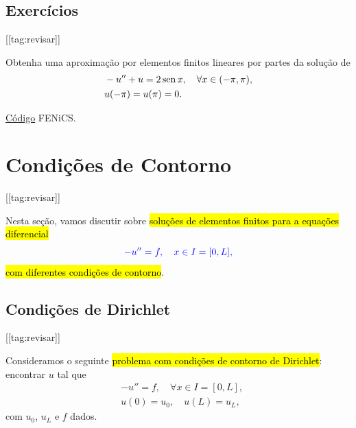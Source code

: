 \subsection{Exercícios}
[[tag:revisar]]

\begin{exer}\label{exer:dc}
  Obtenha uma aproximação por elementos finitos lineares por partes da solução de
  \begin{align}
    &-u'' + u = 2\operatorname{sen} x,\quad \forall x\in (-\pi, \pi),\\
    &u(-\pi)=u(\pi)=0.
  \end{align}
\end{exer}
\begin{resp}
  \ifispython
  \href{https://github.com/phkonzen/notas/blob/master/src/MetodoElementosFinitos/cap_mef1d/dados/exer_dc/exer_dc.py}{Código} FENiCS.
  \fi
\end{resp}


\section{Condições de Contorno}\label{cap_mef1d_sec_cc}
[[tag:revisar]]

Nesta seção, vamos discutir sobre \hl{soluções de elementos finitos para a equações diferencial}
\begin{equation}\color{blue}-u'' = f,\quad x\in I=[0, L],
\end{equation}
\hl{com diferentes condições de contorno}.

\subsection{Condições de Dirichlet}
[[tag:revisar]]

Consideramos o seguinte \hl{problema com condições de contorno de Dirichlet}{\dirichlet}: encontrar $u$ tal que
\begin{align}
  &-u'' = f,\quad \forall x\in I=[0, L],\label{eq:cc_d_eq}\\
  &u(0) = u_0,\quad u(L) = u_L,\label{eq:cc_d_bc}
\end{align}
com $u_0$, $u_L$ e $f$ dados.

